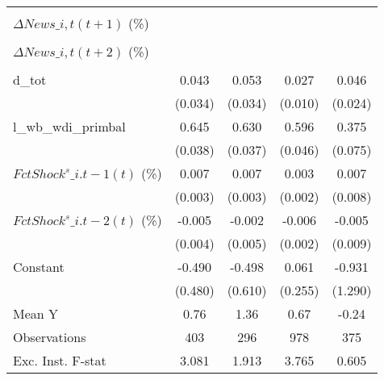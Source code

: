 {\begin{tabular}{l*{4}{c}}
                    &                     &                     &                     &                     \\
\addlinespace
$ \Delta News\_{i,t}(t+1)$ (\%)&                     &                     &                     &                     \\
                    &                     &                     &                     &                     \\
\addlinespace
$ \Delta News\_{i,t}(t+2)$ (\%)&                     &                     &                     &                     \\
                    &                     &                     &                     &                     \\
\addlinespace
d\_tot               &       0.043         &       0.053         &       0.027\sym{***}&       0.046\sym{*}  \\
                    &     (0.034)         &     (0.034)         &     (0.010)         &     (0.024)         \\
\addlinespace
l\_wb\_wdi\_primbal    &       0.645\sym{***}&       0.630\sym{***}&       0.596\sym{***}&       0.375\sym{***}\\
                    &     (0.038)         &     (0.037)         &     (0.046)         &     (0.075)         \\
\addlinespace
$ FctShock^s\_{i.t-1}(t)$ (\%)&       0.007\sym{**} &       0.007\sym{*}  &       0.003\sym{*}  &       0.007         \\
                    &     (0.003)         &     (0.003)         &     (0.002)         &     (0.008)         \\
\addlinespace
$ FctShock^s\_{i.t-2}(t)$ (\%)&      -0.005         &      -0.002         &      -0.006\sym{**} &      -0.005         \\
                    &     (0.004)         &     (0.005)         &     (0.002)         &     (0.009)         \\
\addlinespace
Constant            &      -0.490         &      -0.498         &       0.061         &      -0.931         \\
                    &     (0.480)         &     (0.610)         &     (0.255)         &     (1.290)         \\
\midrule
Mean Y              &        0.76         &        1.36         &        0.67         &       -0.24         \\
Observations        &         403         &         296         &         978         &         375         \\
Exc. Inst. F-stat   &       3.081         &       1.913         &       3.765         &       0.605         \\
\bottomrule
\end{tabular}
}
